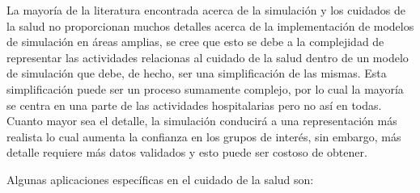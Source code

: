 





	


La mayoría de la literatura encontrada acerca de la simulación y los cuidados de
la salud no proporcionan muchos detalles acerca de la implementación de modelos
de simulación en áreas amplias, se cree que esto se debe a la complejidad de
representar las actividades relacionas al cuidado de la salud dentro de un
modelo de simulación que debe, de hecho, ser una simplificación de las mismas.
Esta simplificación puede ser un proceso sumamente complejo, por lo cual la
mayoría se centra en una parte de las actividades hospitalarias pero no así en
todas. Cuanto mayor sea el detalle, la simulación conducirá a una representación
más realista lo cual aumenta la confianza en los grupos de interés, sin embargo,
más detalle requiere más datos validados y esto puede ser costoso de
obtener\cite{guna:simulation}.

Algunas aplicaciones específicas en el cuidado de la salud son:


